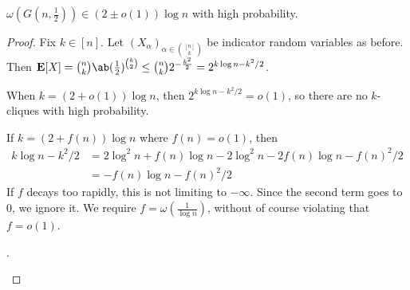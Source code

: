 \begin{theorem}
    $\omega(G(n, \frac12)) \in (2 \pm o(1)) \log n$
    with high probability.
\end{theorem}
\begin{proof}
    Fix $k \in [n]$.
    Let $(X_\alpha)_{\alpha \in \binom{[n]}{k}}$ be indicator random
    variables as before.
    Then $\E[X] = \binom{n}{k} \ab(\frac12)^{\binom{k}{2}} \le
    \binom{n}{k} 2^{-\frac{k^2}{2}} = 2^{k \log n - k^2/2}$.

    When $k = (2 + o(1)) \log n$, then $2^{k \log n - k^2 / 2} = o(1)$,
    so there are no $k$-cliques with high probability.

    If $k = (2 + f(n)) \log n$ where $f(n) = o(1)$, then \begin{align*}
        k \log n - k^2 / 2
            &= 2 \log^2 n + f(n) \log n - 2 \log^2 n - 2 f(n) \log n - f(n)^2 / 2 \\
            &= -f(n) \log n - f(n)^2 / 2
    \end{align*}
    If $f$ decays too rapidly, this is not limiting to $-\infty$.
    Since the second term goes to $0$, we ignore it.
    We require $f = \omega(\frac1{\log n})$,
    without of course violating that $f = o(1)$.

    \begin{exercise}
        .
    \end{exercise}
\end{proof}
